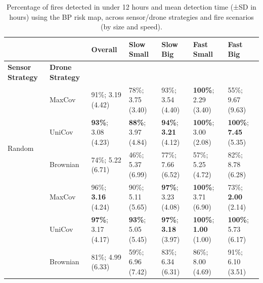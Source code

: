 \renewcommand{\arraystretch}{0.9}

\begin{table}[htbp]
\centering
\tiny

\begin{tabular}{@{}llp{1.5cm}p{1.5cm}p{1.5cm}p{2cm}p{2cm}@{}}
\toprule
 & & Overall & Slow Small & Slow Big & Fast Small & Fast Big \\
\midrule
\textbf{Sensor Strategy} & \textbf{Drone Strategy} & & & & & \\
\midrule

\multirow{4}{*}{Random} 
  & MaxCov   & 91\%; 3.19 (4.42) & 78\%; 3.75 (3.40) & 93\%; 3.54 (4.40) & \textbf{100\%}; 2.29 (3.40) & 55\%; 9.67 (9.63) \\
  & UniCov   & \textbf{93\%}; 3.08 (4.23) & \textbf{88\%}; 3.97 (4.84) & \textbf{94\%}; \textbf{3.21} (4.12) & \textbf{100\%}; 3.00 (2.08) & \textbf{100\%}; \textbf{7.45} (5.35) \\
  & Brownian & 74\%; 5.22 (6.71) & 46\%; 5.37 (6.99) & 77\%; 7.66 (6.52) & 57\%; 5.25 (4.72) & 82\%; 8.78 (6.28) \\
\midrule

\multirow{4}{*}{GaussianCov} 
  & MaxCov   & 96\%; \textbf{3.16} (4.24) & 90\%; 5.11 (5.65) & \textbf{97\%}; 3.23 (4.08) & \textbf{100\%}; 3.71 (6.90) & 73\%; \textbf{2.00} (2.14) \\
  & UniCov   & \textbf{97\%}; 3.17 (4.17) & \textbf{93\%}; 5.05 (5.45) & \textbf{97\%}; \textbf{3.18} (3.97) & \textbf{100\%}; \textbf{1.00} (1.00) & \textbf{100\%}; 5.73 (6.17) \\
  & Brownian & 81\%; 4.99 (6.33) & 59\%; 6.96 (7.42) & 83\%; 6.34 (6.31) & 86\%; 8.00 (4.69) & 91\%; 6.10 (3.51) \\

\bottomrule
\end{tabular}
\caption{Percentage of fires detected in under 12 hours and mean detection time (±SD in hours) using the BP risk map, across sensor/drone strategies and fire scenarios (by size and speed). }\label{tab:bp_results}
\end{table}

